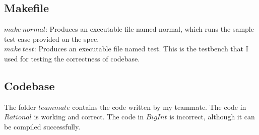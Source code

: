 \documentclass[12pt, A4]{article}
\begin{document}
    \subsection{Makefile}
    
    $make\ normal$: Produces an executable file named normal, which runs the sample test case provided on the spec.\\
    
    $make\ test$: Produces an executable file named test. This is the testbench that I used for testing the correctness of codebase.
    
    \subsection{Codebase}
    
    The folder $teammate$ contains the code written by my teammate. The code in $Rational$ is working and correct. The code in $BigInt$ is incorrect, although it can be compiled successfully.
	
\end{document}
